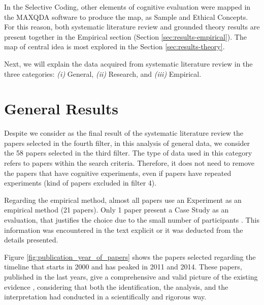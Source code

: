 

In the Selective Coding, other elements of cognitive evaluation were mapped in the MAXQDA software to produce the map, as Sample and Ethical Concepts. For this reason, both systematic literature review and grounded theory results are present together in the Empirical section (Section \ref{sec:results-empirical}). The map of central idea is most explored in the Section \ref{sec:results-theory}.

Next, we will explain the data acquired from systematic literature review in the three categories: \textit{(i)} General, \textit{(ii)} Research, and \textit{(iii)} Empirical.

\section{General Results}
\label{sec:results-general}

Despite we consider as the final result of the systematic literature review the papers selected in the fourth filter, in this analysis of general data, we consider the 58 papers selected in the third filter. The type of data used in this category refers to papers within the search criteria. Therefore, it does not need to remove the papers that have cognitive experiments, even if papers have repeated experiments (kind of papers excluded in filter 4).

Regarding the empirical method, almost all papers use an Experiment as an empirical method (21 papers). Only 1 paper present a Case Study as an evaluation, that justifies the choice due to the small number of participants \cite{Sanchez2008}. This information was encountered in the text explicit or it was deducted from the details presented.

Figure \ref{fig:publication_year_of_papers} shows the papers selected regarding the timeline that starts in 2000 and has peaked in 2011 and 2014. These papers, published in the last years, give a comprehensive and valid picture of the existing evidence \cite{Wohlin2000}, considering that both the identification, the analysis, and the interpretation had conducted in a scientifically and rigorous way.

